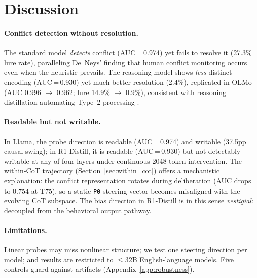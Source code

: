 \documentclass{article}
\newcommand{\pzero}{\texttt{P0}}
\begin{document}
\section{Discussion}
\label{sec:discussion}

\paragraph{Conflict detection without resolution.}
The standard model \emph{detects} conflict (AUC\,=\,0.974) yet fails
to resolve it (27.3\% lure rate), paralleling De~Neys'
\citep{deneys2012bias} finding that human conflict monitoring occurs
even when the heuristic prevails.
The reasoning model shows \emph{less} distinct encoding (AUC\,=\,0.930)
yet much better resolution (2.4\%), replicated in OLMo
(AUC 0.996 $\to$ 0.962; lure 14.9\% $\to$ 0.9\%), consistent with
reasoning distillation automating Type~2 processing
\citep{evans2019reflections, venhoff2025base}.

\paragraph{Readable but not writable.}
In Llama, the probe direction is readable (AUC\,=\,0.974) and writable
(37.5pp causal swing); in R1-Distill, it is readable (AUC\,=\,0.930)
but not detectably writable at any of four layers under continuous
2048-token intervention.  The within-CoT trajectory
(Section~\ref{sec:within_cot}) offers a mechanistic explanation: the
conflict representation rotates during deliberation (AUC drops to 0.754
at T75), so a static \pzero{} steering vector becomes misaligned with
the evolving CoT subspace.  The bias direction in R1-Distill is in
this sense \emph{vestigial}: decoupled from the behavioral output pathway.

\paragraph{Limitations.}
Linear probes may miss nonlinear structure; we test one steering direction
per model; and results are restricted to $\leq$32B English-language models.
Five controls \citep{meloux2025dead, sanitychecks2026} guard against
artifacts (Appendix~\ref{app:robustness}).




\end{document}
